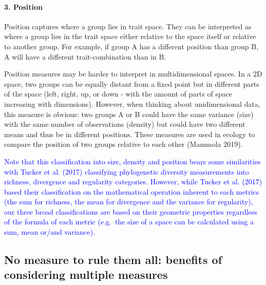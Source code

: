 \documentclass[]{article}
\let\oldparagraph\paragraph
\renewcommand{\paragraph}[1]{\oldparagraph{#1}\mbox{}}
\begin{document}
\paragraph{3. Position}\label{position}

Position captures where a group lies in trait space. They can be
interpreted as where a group lies in the trait space either relative to
the space itself or relative to another group. For example, if group A
has a different position than group B, A will have a different
trait-combination than in B.

Position measures may be harder to interpret in multidimensional spaces.
In a 2D space, two groups can be equally distant from a fixed point but
in different parts of the space (left, right, up, or down - with the
amount of parts of space increasing with dimensions). However, when
thinking about unidimensional data, this measure is obvious: two groups
A or B could have the same variance (size) with the same number of
observations (density) but could have two different means and thus be in
different positions. These measures are used in ecology to compare the
position of two groups relative to each other (Mammola 2019).

\textcolor{blue}{ Note that this classification into
size, density and position bears some similarities with Tucker et al.
(2017) classifying phylogenetic diversity measurements into richness,
divergence and regularity categories. However, while Tucker et al.
(2017) based their classification on the mathematical operation inherent
to each metrics (the sum for richness, the mean for divergence and the
variance for regularity), our three broad classifications are based on
their geometric properties regardless of the formula of each metric
(e.g.~the size of a space can be calculated using a sum, mean or/and
variance). }

\subsection{No measure to rule them all: benefits of considering
multiple
measures}\label{no-measure-to-rule-them-all-benefits-of-considering-multiple-measures}
\end{document}
